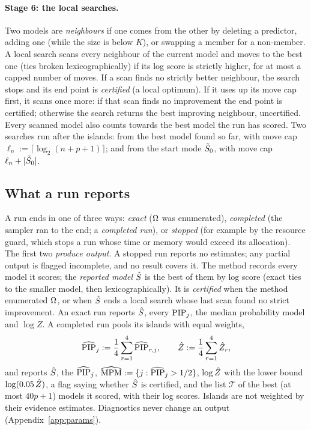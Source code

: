 \paragraph{Stage 6: the local searches.} Two models are \emph{neighbours} if one comes from the other by deleting a
predictor, adding one (while the size is below $K$), or swapping a member for a non-member. A local search scans every
neighbour of the current model and moves to the best one (ties broken lexicographically) if its log score is strictly
higher, for at most a capped number of moves. If a scan finds no strictly better neighbour, the search stops and its end
point is \emph{certified} (a local optimum). If it uses up its move cap first, it scans once more: if that scan finds no
improvement the end point is certified; otherwise the search returns the best improving neighbour, uncertified. Every
scanned model also counts towards the best model the run has scored. Two searches run after the islands: from the best model found so far, with move cap
$\ell_n:=\lceil\log_2(n+p+1)\rceil$; and from the start mode $\tilde S_0$, with move cap $\ell_n+\lvert \tilde S_0\rvert$.

\subsection{What a run reports}\label{sec:outputs-method}

A run ends in one of three ways: \emph{exact} ($\Omega$ was enumerated), \emph{completed} (the sampler ran to the end; a
\emph{completed run}), or \emph{stopped} (for example by the resource guard, which stops a run whose time or memory would
exceed its allocation). The first two \emph{produce output}. A stopped run reports no estimates; any partial output is
flagged incomplete, and no result covers it. The method records every model
it scores; the \emph{reported model} $\hat S$ is the best of them by log score (exact ties to the smaller model, then
lexicographically). It is \emph{certified} when the method enumerated $\Omega$, or when $\hat S$ ends a local search whose last
scan found no strict improvement. An exact run reports $\hat S$, every $\mathrm{PIP}_j$, the median probability model and $\log Z$.
A completed run pools its islands with equal weights,
\begin{equation}\label{eq:pool}
  \widehat{\mathrm{PIP}}_j:=\frac14\sum_{r=1}^4\widehat{\mathrm{PIP}}_{r,j},\qquad \hat Z:=\frac14\sum_{r=1}^4\hat Z_r,
\end{equation}
and reports $\hat S$, the $\widehat{\mathrm{PIP}}_j$, $\widehat{\mathrm{MPM}}:=\{j:\widehat{\mathrm{PIP}}_j>1/2\}$, $\log\hat Z$ with the lower bound
$\log(0.05\,\hat Z)$, a flag saying whether $\hat S$ is certified, and the list $\mathcal T$ of the best (at most $40p+1$)
models it scored, with their log scores. Islands are not weighted by their evidence estimates. Diagnostics never change an
output (Appendix~\ref{app:params}).

